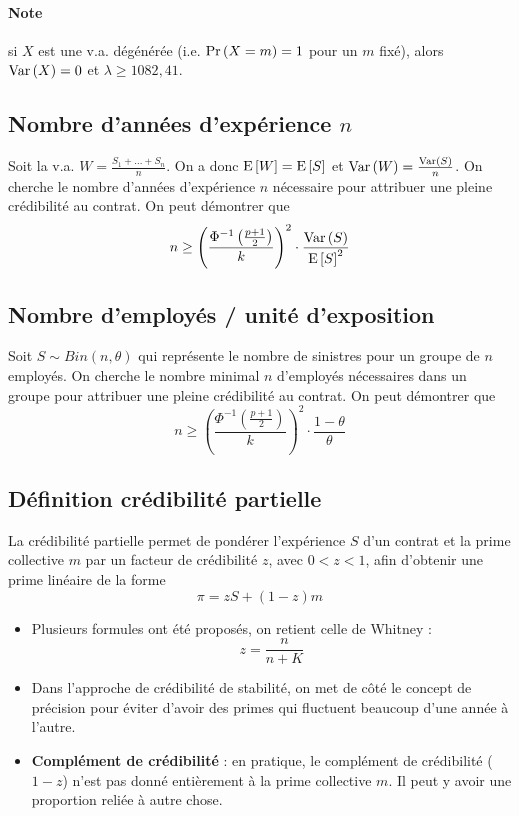 \documentclass[10pt, french]{article}
\begin{document}
\begin{multicols*}{3}
\paragraph{Note} si $X$ est une v.a. dégénérée (i.e. $\Pr \left( X = m \right) = 1$ pour un $m$ fixé), alors $\mathrm{Var} \left( X \right) = 0$ et $\lambda \geq 1082,41$.

\subsection*{Nombre d'années d'expérience $n$}
Soit la v.a. $W = \frac{S_1 + ... + S_n}{n}$. On a donc $\mathrm{E} \left[ W \right] = \mathrm{E} \left[ S \right]$ et $\mathrm{Var} \left( W \right) = \frac{\mathrm{Var} \left( S \right)}{n}$. On cherche le nombre d'années d'expérience $n$ nécessaire pour attribuer une pleine crédibilité au contrat. On peut démontrer que
\begin{equation}
n \geq \left( \frac{\Phi^{-1}\left(\frac{p+1}{2} \right)}{k} \right)^2 \cdot \frac{\mathrm{Var} \left( S \right)}{\mathrm{E} \left[ S \right]^2}
\end{equation}

\subsection*{Nombre d'employés / unité d'exposition}
Soit $S \sim Bin(n, \theta)$ qui représente le nombre de sinistres pour un groupe de $n$ employés. On cherche le nombre minimal $n$ d'employés nécessaires dans un groupe pour attribuer une pleine crédibilité au contrat. On peut démontrer que
\begin{equation}
n \geq \left( \frac{\Phi^{-1}\left(\frac{p+1}{2} \right)}{k} \right)^2 \cdot \frac{1 - \theta}{\theta}
\end{equation}

\subsection*{Définition crédibilité partielle}
\begin{definition}
La crédibilité partielle permet de pondérer l'expérience $S$ d'un contrat et la prime collective $m$ par un facteur de crédibilité $z$, avec $0 < z < 1$, afin d'obtenir une prime linéaire de la forme
\[\pi = z S + (1-z) m\]
\end{definition}
\begin{itemize}
\item Plusieurs formules ont été proposés, on retient celle de Whitney : 
\begin{equation}
z = \frac{n}{n+K}
\end{equation}
\item Dans l'approche de crédibilité de stabilité, on met de côté le concept de précision pour éviter d'avoir des primes qui fluctuent beaucoup d'une année à l'autre.
\item \textbf{Complément de crédibilité} : en pratique, le complément de crédibilité ($1-z$) n'est pas donné entièrement à la prime collective $m$. Il peut y avoir une proportion reliée à autre chose.
\end{itemize}



\end{multicols*}
\end{document}
